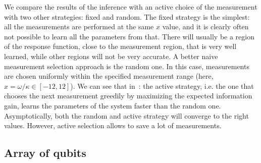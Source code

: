 \documentclass[10pt]{iopart}  %
\begin{document}
We compare the results of the inference with an active choice of the measurement with two other strategies: fixed and random.
The fixed strategy is the simplest: all the measurements are performed at the same $x$ value, and it is clearly often not possible to learn all the parameters from that.
There will usually be a region of the response function, close to the measurement region, that is very well learned, while other regions will not be very accurate.
A better naive measurement selection approach is the random one.
In this case, measurements are chosen uniformly within the specified measurement range (here, $x=\omega/\kappa\in[-12,12]$).
We can see that in~: the active strategy, i.e. the one that chooses the next measurement greedily by maximizing the expected information gain, learns the parameters of the system faster than the random one.
Asymptotically, both the random and active strategy will converge to the right values.
However, active selection allows to save a lot of measurements.






\subsection{Array of qubits}
\end{document}
